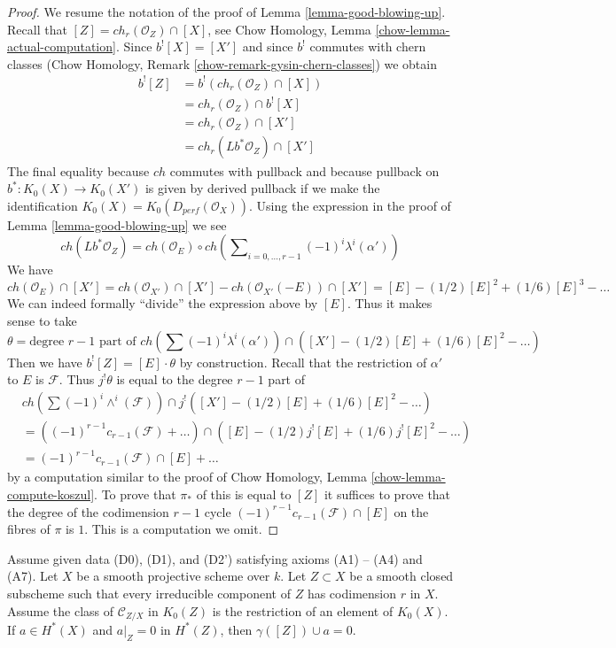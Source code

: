 \begin{proof}
We resume the notation of the proof of Lemma \ref{lemma-good-blowing-up}.
Recall that $[Z] = ch_r(\mathcal{O}_Z) \cap [X]$, see
Chow Homology, Lemma \ref{chow-lemma-actual-computation}.
Since $b^![X] = [X']$ and since $b^!$ commutes with chern classes
(Chow Homology, Remark \ref{chow-remark-gysin-chern-classes}) we obtain
\begin{align*}
b^![Z] & =
b^! (ch_r(\mathcal{O}_Z) \cap [X]) \\
& =
ch_r(\mathcal{O}_Z) \cap b^![X] \\
& =
ch_r(\mathcal{O}_Z) \cap [X'] \\
& =
ch_r(Lb^*\mathcal{O}_Z) \cap [X']
\end{align*}
The final equality because $ch$ commutes with pullback and
because pullback on $b^* : K_0(X) \to K_0(X')$ is given by derived
pullback if we make the identification
$K_0(X) = K_0(D_{perf}(\mathcal{O}_X))$.
Using the expression in the proof of Lemma \ref{lemma-good-blowing-up}
we see
$$
ch(Lb^*\mathcal{O}_Z) =
ch(\mathcal{O}_E) \circ ch\left(
\sum\nolimits_{i = 0, \ldots, r - 1} (-1)^i\lambda^i(\alpha')
\right)
$$
We have
$$
ch(\mathcal{O}_E) \cap [X'] =
ch(\mathcal{O}_{X'}) \cap [X'] - ch(\mathcal{O}_{X'}(-E)) \cap [X'] =
[E] - (1/2)[E]^2 + (1/6)[E]^3 - \ldots
$$
We can indeed formally ``divide'' the expression above by $[E]$.
Thus it makes sense to take
$$
\theta = \text{degree }r - 1\text{ part of }
ch(\sum (-1)^i\lambda^i(\alpha')) \cap
([X'] - (1/2)[E] + (1/6)[E]^2 - \ldots)
$$
Then we have $b^![Z] = [E] \cdot \theta$ by construction.
Recall that the restriction of $\alpha'$ to $E$ is $\mathcal{F}$.
Thus $j^!\theta$ is equal to the degree $r - 1$ part of
\begin{align*}
&
ch(\sum (-1)^i\wedge^i(\mathcal{F})) \cap
j^!([X'] - (1/2)[E] + (1/6)[E]^2 - \ldots)
\\
& =
((-1)^{r - 1}c_{r - 1}(\mathcal{F}) + \ldots) \cap
([E] - (1/2)j^![E] + (1/6)j^![E]^2 - \ldots) \\
& = (-1)^{r - 1}c_{r - 1}(\mathcal{F}) \cap [E] + \ldots
\end{align*}
by a computation similar to the proof of
Chow Homology, Lemma \ref{chow-lemma-compute-koszul}.
To prove that $\pi_*$ of this is equal to $[Z]$ it
suffices to prove that the degree of the codimension $r - 1$ cycle
$(-1)^{r - 1}c_{r - 1}(\mathcal{F}) \cap [E]$ on the fibres of $\pi$ is $1$.
This is a computation we omit.
\end{proof}

\begin{lemma}
\label{lemma-A5-A6-imply}
Assume given data (D0), (D1), and (D2') satisfying axioms (A1) -- (A4)
and (A7). Let $X$ be a smooth projective scheme over $k$. Let $Z \subset X$
be a smooth closed subscheme such that every irreducible component of $Z$
has codimension $r$ in $X$. Assume the class of
$\mathcal{C}_{Z/X}$ in $K_0(Z)$ is the restriction of an element of $K_0(X)$.
If $a \in H^*(X)$ and $a|_Z = 0$ in $H^*(Z)$, then
$\gamma([Z]) \cup a = 0$.
\end{lemma}

